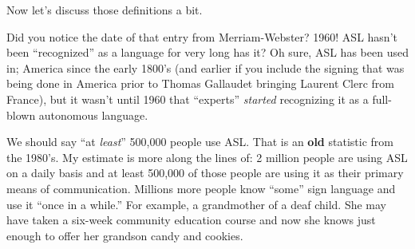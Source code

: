 \documentclass{article}
\begin{document}
Now let's discuss those definitions a bit.

Did you notice the date of that entry from Merriam-Webster?
1960!
ASL hasn't been ``recognized'' as a language for very long has it?
Oh sure, ASL has been used in; America since the early 1800's (and earlier if you include the signing that was being done in America prior to Thomas Gallaudet bringing Laurent Clerc from France), but it wasn't until 1960 that ``experts'' \emph{started} recognizing it as a full-blown autonomous language.

We should say ``at \emph{least}'' 500,000 people use ASL.
That is an \textbf{old} statistic from the 1980's.
My estimate is more along the lines of:
2 million people are using ASL on a daily basis and at least 500,000 of those people are using it as their primary means of communication.
Millions more people know ``some'' sign language and use it ``once in a while.''
For example, a grandmother of a deaf child.
She may have taken a six-week community education course and now she knows just enough to offer her grandson candy and cookies.
\end{document}
